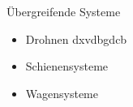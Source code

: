 	\begin{description}
	\item {Übergreifende Systeme}
	\begin{itemize}
		\item {Drohnen}
		dxvdbgdcb
		\item {Schienensysteme}
		\item {Wagensysteme}
	\end{itemize}
\end{description}